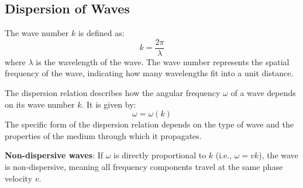 \documentclass[11pt]{report}
\begin{document}
\subsection{Dispersion of Waves}
\begin{definition}
    The wave number \( k \) is defined as:
    \begin{equation}
        k = \frac{2\pi}{\lambda}
    \end{equation}
    where \( \lambda \) is the wavelength of the wave. The wave number represents the spatial frequency of the wave, indicating how many wavelengths fit into a unit distance.
\end{definition}
\begin{definition}
    The dispersion relation describes how the angular frequency \( \omega \) of a wave depends on its wave number \( k \). It is given by:
    \begin{equation}
        \omega = \omega(k)
    \end{equation}
    The specific form of the dispersion relation depends on the type of wave and the properties of the medium through which it propagates.

    \textbf{Non-dispersive waves}: If \( \omega \) is directly proportional to \( k \) (i.e., \( \omega = vk \)), the wave is non-dispersive, meaning all frequency components travel at the same phase velocity \( v \).
\end{definition}
\end{document}
